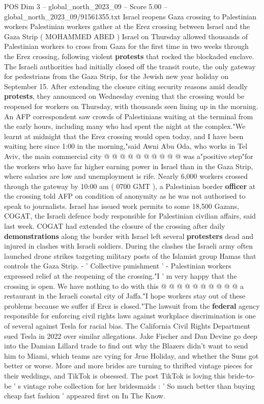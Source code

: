 \begin{textsample}{POS Dim 3 – global\_north\_2023\_09 – Score 5.00 – global\_north\_2023\_09/91561355.txt}  \label{ex:f3_pos_069}
Israel reopens Gaza crossing to Palestinian workers Palestinian workers gather at the Erez crossing between Israel and the Gaza Strip ( MOHAMMED ABED ) Israel on Thursday allowed thousands of Palestinian workers to cross from Gaza for the first time in two weeks through the Erez crossing, following violent \textbf{protests} that rocked the blockaded enclave.
The Israeli authorities had initially closed off the transit route, the only gateway for pedestrians from the Gaza Strip, for the Jewish new year holiday on September 15.
After extending the closure citing security reasons amid deadly \textbf{protests}, they announced on Wednesday evening that the crossing would be reopened for workers on Thursday, with thousands seen lining up in the morning.
An AFP correspondent saw crowds of Palestinians waiting at the terminal from the early hours, including many who had spent the night at the complex."We learnt at midnight that the Erez crossing would open today, and I have been waiting here since 1:00 in the morning,"said Awni Abu Oda, who works in Tel Aviv, the main commercial city @ @ @ @ @ @ @ @ @ @ was a"positive step"for the workers who have far higher earning power in Israel than in the Gaza Strip, where salaries are low and unemployment is rife.
Nearly 6,000 workers crossed through the gateway by 10:00 am ( 0700 GMT ), a Palestinian border \textbf{officer} at the crossing told AFP on condition of anonymity as he was not authorised to speak to journalists.
Israel has issued work permits to some 18,500 Gazans, COGAT, the Israeli defence body responsible for Palestinian civilian affairs, said last week.
COGAT had extended the closure of the crossing after daily \textbf{demonstrations} along the border with Israel left several \textbf{protesters} dead and injured in clashes with Israeli soldiers.
During the clashes the Israeli army often launched drone strikes targeting military posts of the Islamist group Hamas that controls the Gaza Strip. - ' Collective punishment ' - Palestinian workers expressed relief at the reopening of the crossing."I ' m very happy that the crossing is open.
We have nothing to do with this @ @ @ @ @ @ @ @ @ @ a restaurant in the Israeli coastal city of Jaffa."I hope workers stay out of these problems because we suffer if Erez is closed."The lawsuit from the \textbf{federal} agency responsible for enforcing civil rights laws against workplace discrimination is one of several against Tesla for racial bias.
The California Civil Rights Department sued Tesla in 2022 over similar allegations.
Jake Fischer and Dan Devine go deep into the Damian Lillard trade to find out why the Blazers didn't want to send him to Miami, which teams are vying for Jrue Holiday, and whether the Suns got better or worse.
More and more brides are turning to thrifted vintage pieces for their weddings, and TikTok is obsessed.
The post TikTok is loving this bride-to-be ' s vintage robe collection for her bridesmaids : ' So much better than buying cheap fast fashion ' appeared first on In The Know.

\end{textsample}
